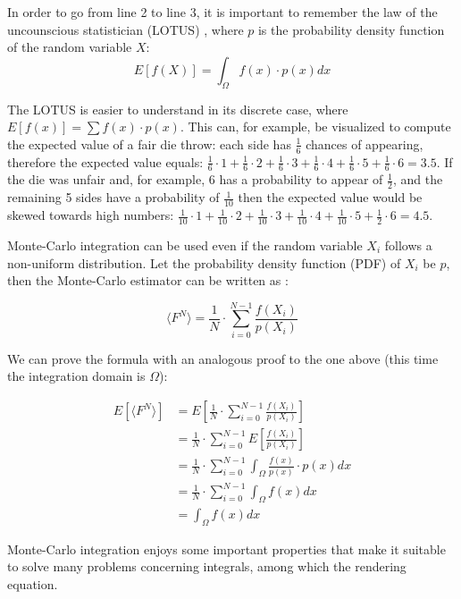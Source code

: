 \documentclass{PoliMi_MasterThesis}
\begin{document}
In order to go from line 2 to line 3, it is important to remember the law of the uncounscious statistician (LOTUS) \cite{lotus}, where $p$ is the probability density function of the random variable $X$:
$$E[\textit{f}(X)] = \int_{\Omega}\textit{f}(x)\cdot p(x) dx$$ 

The LOTUS is easier to understand in its discrete case, where $E[\textit{f}(x)] = \sum\textit{f}(x)\cdot p(x)$. This can, for example, be visualized to compute the expected value of a fair die throw: each side has $\frac{1}{6}$ chances of appearing, therefore the expected value equals: $\frac{1}{6} \cdot 1 + \frac{1}{6} \cdot 2 + \frac{1}{6} \cdot 3 + \frac{1}{6} \cdot 4 + \frac{1}{6} \cdot 5 + \frac{1}{6} \cdot 6 = 3.5$. If the die was unfair and, for example, $6$ has a probability to appear of $\frac{1}{2}$, and the remaining 5 sides have a probability of $\frac{1}{10}$ then the expected value would be skewed towards high numbers: $\frac{1}{10} \cdot 1 + \frac{1}{10} \cdot 2 + \frac{1}{10} \cdot 3 + \frac{1}{10} \cdot 4 + \frac{1}{10} \cdot 5 + \frac{1}{2} \cdot 6 = 4.5$. 

Monte-Carlo integration can be used even if the random variable $X_i$ follows a non-uniform distribution. Let the probability density function (PDF) of $X_i$ be $p$, then the Monte-Carlo estimator can be written as \cite{monte_carlo_estimators_veach} \cite{monte_carlo_estimators_scratchapixel}:

$$\langle F^N \rangle = \frac{1}{N}\cdot\sum_{i=0}^{N-1}\frac{\textit{f}(X_i)}{p(X_i)}$$

We can prove the formula with an analogous proof to the one above (this time the integration domain is $\Omega$): 

\begin{subequations}
	\begin{align*}
		E[\langle F^N \rangle] &= E[\frac{1}{N}\cdot\sum_{i=0}^{N-1}\frac{\textit{f}(X_i)}{p(X_i)}] \\
		&= \frac{1}{N}\cdot\sum_{i=0}^{N-1}E[\frac{\textit{f}(X_i)}{p(X_i)}] \\
		&= \frac{1}{N}\cdot\sum_{i=0}^{N-1}\int_{\Omega}\frac{\textit{f}(x)}{p(x)} \cdot p(x) dx \\
		&= \frac{1}{N}\cdot\sum_{i=0}^{N-1}\int_{\Omega}\textit{f}(x) dx \\
		&= \int_{\Omega}\textit{f}(x) dx
	\end{align*}
\end{subequations}

Monte-Carlo integration enjoys some important properties that make it suitable to solve many problems concerning integrals, among which the rendering equation.
\end{document}

